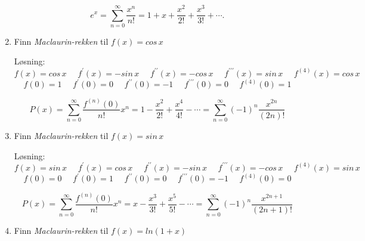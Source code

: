 \documentclass[11pt]{article}
\theoremstyle{definition}
\theoremstyle{definition}
\theoremstyle{definition}
\theoremstyle{definition}
\theoremstyle{definition}
\theoremstyle{definition}
\begin{document}
\begin{enumerate}
			\[e^x=\sum_{n=0}^{\infty}\dfrac{x^n}{n!}=1+x+\dfrac{x^2}{2!}+\dfrac{x^3}{3!}+\cdots. \]
			
			\newpage
			
			\item Finn \textit{Maclaurin-rekken} til \(f(x)=cos\,x\)
			
			Løsning:
			\[f(x)=cos\,x \hspace{16pt} f^{\prime}(x)=-sin\,x \hspace{16pt} f^{\prime \prime}(x)=-cos\,x \hspace{16pt} f^{\prime \prime \prime}(x)=sin\,x \hspace{16pt} f^{(4)}(x)=cos\,x \]
			\[f(0)=1 \hspace{16pt} f^{\prime}(0)=0 \hspace{16pt} f^{\prime \prime}(0)=-1 \hspace{16pt} f^{\prime \prime \prime}(0)=0 \hspace{16pt} f^{(4)}(0)=1 \]
			
			\[P(x)=\sum_{n=0}^{\infty} \dfrac{f^{(n)}(0)}{n!}x^n=1-\frac{x^2}{2!}+\frac{x^4}{4!}-\cdots=\sum_{n=0}^{\infty} (-1)^n\frac{x^{2n}}{(2n)!} \]
			
			\item Finn \textit{Maclaurin-rekken} til \(f(x)=sin\,x\)
			
			Løsning:
			\[f(x)=sin\,x \hspace{16pt} f^{\prime}(x)=cos\,x \hspace{16pt} f^{\prime \prime}(x)=-sin\,x \hspace{16pt} f^{\prime \prime \prime}(x)=-cos\,x \hspace{16pt} f^{(4)}(x)=sin\,x \]
			\[f(0)=0 \hspace{16pt} f^{\prime}(0)=1 \hspace{16pt} f^{\prime \prime}(0)=0 \hspace{16pt} f^{\prime \prime \prime}(0)=-1 \hspace{16pt} f^{(4)}(0)=0 \]
			
			\[P(x)=\sum_{n=0}^{\infty} \dfrac{f^{(n)}(0)}{n!}x^n=
			x-\dfrac{x^3}{3!}+\dfrac{x^5}{5!}-\cdots=
			\sum_{n=0}^{\infty}(-1)^n\dfrac{x^{2n+1}}{(2n+1)!}  \]
			
			\item Finn \textit{Maclaurin-rekken} til \(f(x)=ln(1+x)\)
			

\end{enumerate}
\end{document}

